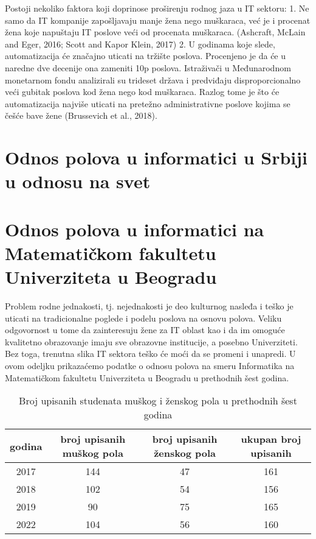 \documentclass[a4paper]{article}
\begin{document}
Postoji nekoliko faktora koji doprinose proširenju rodnog jaza u IT sektoru:
1. Ne samo da IT kompanije zapošljavaju manje žena nego muškaraca, već  je i procenat žena koje napuštaju IT poslove veći od procenata muškaraca. (Ashcraft,  McLain  and  Eger,  2016;  Scott  and  Kapor  Klein,  2017)
2. U godinama koje slede, automatizacija će značajno uticati na tržište poslova. Procenjeno je da će u naredne dve decenije ona zameniti 10p poslova. Istraživači u Međunarodnom monetarnom fondu analizirali su trideset država i predviđaju disproporcionalno veći gubitak poslova kod žena nego kod muškaraca. Razlog tome je što će automatizacija najviše uticati na pretežno administrativne poslove kojima se češće bave žene (Brussevich et al., 2018). 




\section{Odnos polova u informatici u Srbiji u odnosu na svet}	




\section{Odnos polova u informatici na Matematičkom fakultetu Univerziteta u Beogradu}
\label{matematicki}
Problem rodne jednakosti, tj. nejednakosti je deo kulturnog nasleđa i teško je uticati na tradicionalne poglede i podelu poslova na osnovu polova. Veliku odgovornost u tome da zainteresuju žene za IT oblast kao i da im omoguće kvalitetno obrazovanje imaju sve obrazovne institucije, a posebno Univerziteti. Bez toga, trenutna slika IT sektora teško će moći da se promeni i unapredi.
U ovom odeljku prikazaćemo podatke o odnosu polova na smeru Informatika na Matematičkom fakultetu Univerziteta u Beogradu u prethodnih šest godina. \\

\begin{table}[h!]
\begin{center}
\caption{Broj upisanih studenata muškog i ženskog pola u prethodnih šest godina}

\begin{tabular}{|c|c|c|c|} \hline
godina&broj upisanih muškog pola& broj upisanih ženskog pola & ukupan broj upisanih\\ \hline
2017&144&47&161\\ \hline
2018&102&54&156\\ \hline
2019&90&75&165\\ \hline
2022&104&56&160\\ \hline

\end{tabular}
\label{tab:tabela1}
\end{center}
\end{table}
\end{document}
